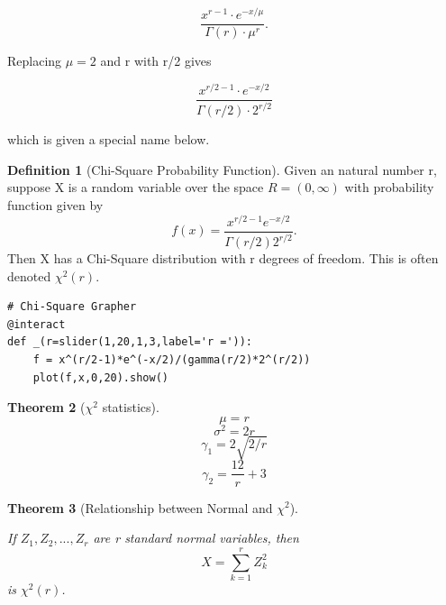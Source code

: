 \documentclass[10pt,]{book}
\theoremstyle{plain}
\newtheorem{theorem}{Theorem}[section]
\theoremstyle{definition}
\newtheorem{definition}[theorem]{Definition}
\theoremstyle{definition}
\theoremstyle{definition}
\numberwithin{equation}{section}
\begin{document}
	\begin{equation*}\frac{x^{r-1} \cdot e^{-x / \mu}}{\Gamma(r) \cdot \mu^r}.\end{equation*}

Replacing \(\mu = 2\) and r with r/2 gives

	\begin{equation*}\frac{x^{r/2-1} \cdot e^{-x/2}}{\Gamma(r/2) \cdot 2^{r/2}}\end{equation*}

which is given a special name below.
\par


	\begin{definition}[{Chi-Square Probability Function}]\label{definition-36}
Given an natural number r, suppose X is a random variable over the space \(R = (0,\infty)\) with probability function given by
	\begin{equation*}f(x) = \frac{x^{r/2-1} e^{-x/2} }{\Gamma(r/2) 2^{r/2}}.\end{equation*}
	Then X has a Chi-Square distribution with r degrees of freedom. This is often denoted \(\chi^2(r)\).
	\end{definition}


\begin{lstlisting}[style=sageinput]
# Chi-Square Grapher
@interact
def _(r=slider(1,20,1,3,label='r =')):
    f = x^(r/2-1)*e^(-x/2)/(gamma(r/2)*2^(r/2))
    plot(f,x,0,20).show()
\end{lstlisting}


	\begin{theorem}[{\(\chi^2\) statistics}]\label{theorem-62}
\begin{equation*}\mu = r\end{equation*}\begin{equation*}\sigma^2 = 2r\end{equation*}\begin{equation*}\gamma_1 = 2 \sqrt{2/r}\end{equation*}\begin{equation*}\gamma_2 = \frac{12}{r} + 3\end{equation*}\end{theorem}

	
	\begin{theorem}[{Relationship between Normal and \(\chi^2\)}]\label{theorem-63}

	If \(Z_1, Z_2, ..., Z_r\) are r standard normal variables, then
	\begin{equation*} X = \sum_{k=1}^r Z_k^2\end{equation*}
	is \(\chi^2(r)\).
	\end{theorem}
\end{document}
